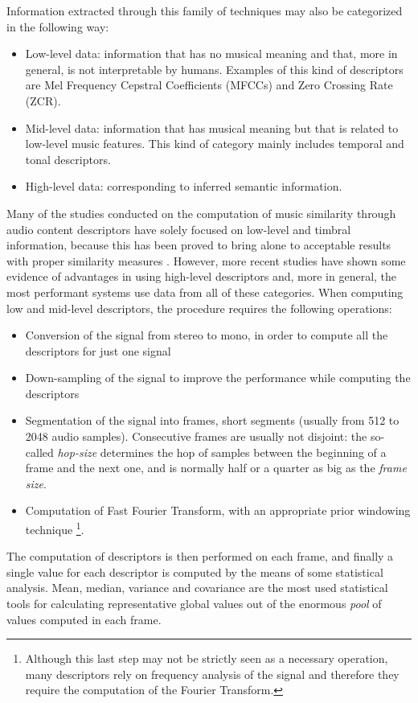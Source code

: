 Information extracted through this family of techniques may also be categorized in the following way:
\begin{itemize}
\item Low-level data: information that has no musical meaning and that, more in general, is not interpretable by humans. Examples of this kind of descriptors are Mel Frequency Cepstral Coefficients (MFCCs) and Zero Crossing Rate (ZCR).
\item Mid-level data: information that has musical meaning but that is related to low-level music features. This kind of category mainly includes temporal and tonal descriptors. 
\item High-level data: corresponding to inferred semantic information.
\end{itemize}

Many of the studies conducted on the computation of music similarity through audio content descriptors have solely focused on low-level and timbral information, because this has been proved to bring alone to acceptable results with proper similarity measures \cite{mirage07}. However, more recent studies have shown some evidence of advantages in using high-level descriptors \cite{barrington07} \cite{west07} and, more in general, the most performant systems use data from all of these categories. When computing low and mid-level descriptors, the procedure requires the following operations:
\begin{itemize}
\item Conversion of the signal from stereo to mono, in order to compute all the descriptors for just one signal
\item Down-sampling of the signal to improve the performance while computing the descriptors
\item Segmentation of the signal into frames, short segments (usually from 512 to 2048 audio samples). Consecutive frames are usually not disjoint: the so-called \textit{hop-size} determines the hop of samples between the beginning of a frame and the next one, and is normally half or a quarter as big as the \textit{frame size}.
\item Computation of Fast Fourier Transform, with an appropriate prior windowing technique \footnote{Although this last step may not be strictly seen as a necessary operation, many descriptors rely on frequency analysis of the signal and therefore they require the computation of the Fourier Transform.}.
\end{itemize}
The computation of descriptors is then performed on each frame, and finally a single value for each descriptor is computed by the means of some statistical analysis. Mean, median, variance and covariance are the most used statistical tools for calculating representative global values out of the enormous \textit{pool} of values computed in each frame.\\
